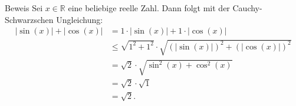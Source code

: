 \documentclass[10pt]{beamer}
\def\bR{\mathbb{R}}
\begin{document}
\begin{frame}{Beweis}
    Sei \( x \in \bR \) eine beliebige reelle Zahl. Dann folgt mit der Cauchy-Schwarzschen Ungleichung:
    \begin{align*}
        \left\vert \sin\left( x \right) \right\vert + \left\vert \cos\left( x \right) \right\vert
        & = 1 \cdot \left\vert \sin\left( x \right) \right\vert + 1 \cdot \left\vert \cos\left( x \right) \right\vert \\
        & \leq \sqrt{1^{2} + 1^{2}} \cdot \sqrt{\left( \left\vert \sin\left( x \right) \right\vert \right)^{2} + \left( \left\vert \cos\left( x \right) \right\vert \right)^{2}} \\
        & = \sqrt{2} \cdot \sqrt{\sin^{2}\left( x \right) + \cos^{2}\left( x \right)} \\
        & = \sqrt{2} \cdot \sqrt{1} \\
        & = \sqrt{2}.
    \end{align*}
\end{frame}
\end{document}
